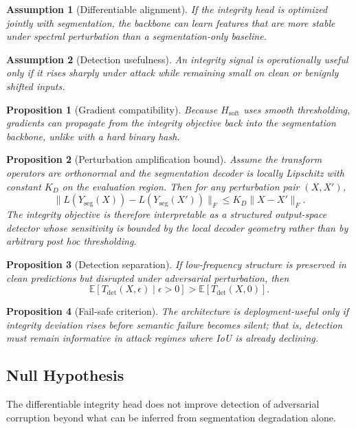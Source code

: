 \documentclass[11pt]{article}
\newtheorem{assumption}{Assumption}
\newtheorem{proposition}{Proposition}
\begin{document}
\begin{assumption}[Differentiable alignment]
If the integrity head is optimized jointly with segmentation, the backbone can learn features that are more stable under spectral perturbation than a segmentation-only baseline.
\end{assumption}

\begin{assumption}[Detection usefulness]
An integrity signal is operationally useful only if it rises sharply under attack while remaining small on clean or benignly shifted inputs.
\end{assumption}

\begin{proposition}[Gradient compatibility]
Because $H_{\mathrm{soft}}$ uses smooth thresholding, gradients can propagate from the integrity objective back into the segmentation backbone, unlike with a hard binary hash.
\end{proposition}

\begin{proposition}[Perturbation amplification bound]
Assume the transform operators are orthonormal and the segmentation decoder is locally Lipschitz with constant $K_D$ on the evaluation region. Then for any perturbation pair $(X,X')$,
\[
\|L(Y_{\mathrm{seg}}(X))-L(Y_{\mathrm{seg}}(X'))\|_F
\le K_D \|X-X'\|_F.
\]
The integrity objective is therefore interpretable as a structured output-space detector whose sensitivity is bounded by the local decoder geometry rather than by arbitrary post hoc thresholding.
\end{proposition}

\begin{proposition}[Detection separation]
If low-frequency structure is preserved in clean predictions but disrupted under adversarial perturbation, then
\[
\mathbb{E}[T_{\mathrm{det}}(X,\epsilon)\mid \epsilon>0]>\mathbb{E}[T_{\mathrm{det}}(X,0)].
\]
\end{proposition}

\begin{proposition}[Fail-safe criterion]
The architecture is deployment-useful only if integrity deviation rises before semantic failure becomes silent; that is, detection must remain informative in attack regimes where IoU is already declining.
\end{proposition}

\subsection*{Null Hypothesis}
The differentiable integrity head does not improve detection of adversarial corruption beyond what can be inferred from segmentation degradation alone.
\end{document}
